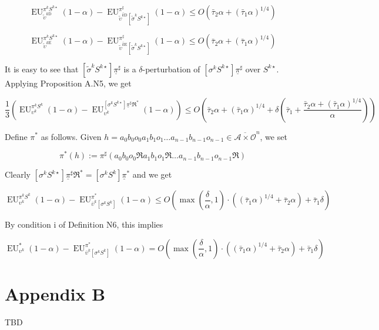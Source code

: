 \documentclass[a4paper]{article}
\newcommand{\Comment}[1]{}
\newcommand{\AP}[1]{\left(#1\right)}
\newcommand{\AB}[1]{\left[#1\right]}
\newcommand{\Ob}{\mathcal{O}}
\newcommand{\A}{\mathcal{A}}
\newcommand{\RMD}{\mathrm{D}}
\newcommand{\RME}{\mathrm{E}}
\newcommand{\EU}{\operatorname{EU}}
\begin{document}
$$\EU_{\tilde{\upsilon}^{k\RMD}}^{\pi^kS^{k\star}}(1-\alpha) - \EU_{\overline{\tilde{\upsilon}^{k\RMD}}\AB{\tilde{\sigma}^k S^{k\star}}}^{\pi^\sharp}(1-\alpha) \leq O\AP{\bar{\tau}_2 \alpha + (\bar{\tau}_1 \alpha)^{1/4}}$$

$$\EU_{\tilde{\upsilon}^{k\RME}}^{\pi^kS^{k\star}}(1-\alpha) - \EU_{\overline{\tilde{\upsilon}^{k\RME}}\AB{\tilde{\sigma}^k S^{k\star}}}^{\pi^\sharp}(1-\alpha) \leq O\AP{\bar{\tau}_2 \alpha + (\bar{\tau}_1 \alpha)^{1/4}}$$

It is easy to see that $\AB{\tilde{\sigma}^k S^{k\star}}\underline{\pi}^\sharp$ is a $\delta$-perturbation of $\AB{\sigma^k S^{k\star}}\underline{\pi}^\sharp$ over $S^{k\star}$. Applying Proposition A.N5, we get

$$\frac{1}{3}\AP{\EU_{\upsilon^k}^{\pi^k S^{k}}(1-\alpha)-\EU_{\upsilon^k}^{\AB{\sigma^k S^{k\star}}\underline{\pi}^\sharp\Re^*}(1-\alpha)} \leq O\AP{\bar{\tau}_2 \alpha + (\bar{\tau}_1 \alpha)^{1/4} + \delta\AP{\bar{\tau}_1+\frac{\bar{\tau}_2 \alpha + (\bar{\tau}_1 \alpha)^{1/4}}{\alpha}}}$$

\Comment{Given $h = a_0 b_0 o_0 a_1 b_1 o_1 \ldots a_{n-1} b_{n-1} o_{n-1} \in \overline{\A \times \Ob}^n$, we use the notation 

$$\bar{\Re}^*h := a_0 b_0 o_0 \Re a_1 b_1 o_1 \Re \ldots a_{n-1} b_{n-1} o_{n-1} \Re \in \overline{\A \times \Ob'}^n$$

We define $\pi^*$ as by $\pi^*(h) := \pi^\star\AP{\bar{\Re}^*h}$.}

Define $\pi^*$ as follows. Given $h = a_0 b_0 o_0 a_1 b_1 o_1 \ldots a_{n-1} b_{n-1} o_{n-1} \in \overline{\A \times \Ob}^n$, we set

$$\pi^*(h) := \pi^\sharp\AP{a_0 b_0 o_0 \Re a_1 b_1 o_1 \Re \ldots a_{n-1} b_{n-1} o_{n-1} \Re}$$

Clearly $\AB{\sigma^k S^{k\star}}\underline{\pi}^\sharp\Re^* = \AB{\sigma^k S^{k}}\underline{\pi}^*$ and we get

$$\EU_{\upsilon^k}^{\pi^k S^{k}}(1-\alpha)-\EU_{\bar{\upsilon}^k\AB{\sigma^k S^{k}}}^{\pi^*}(1-\alpha) \leq O\AP{\max\AP{\frac{\delta}{\alpha},1}\cdot\AP{(\bar{\tau}_1 \alpha)^{1/4} + \bar{\tau}_2 \alpha}+\bar{\tau}_1\delta}$$

By condition i of Definition N6, this implies

$$\EU_{\upsilon^k}^{*}(1-\alpha)-\EU_{\bar{\upsilon}^k\AB{\sigma^k S^{k}}}^{\pi^*}(1-\alpha) = O\AP{\max\AP{\frac{\delta}{\alpha},1}\cdot\AP{(\bar{\tau}_1 \alpha)^{1/4} + \bar{\tau}_2 \alpha}+\bar{\tau}_1\delta}$$

\section{Appendix B}

TBD
\end{document}
